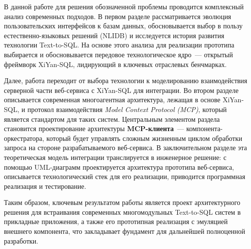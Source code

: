 В данной работе для решения обозначенной проблемы проводится комплексный анализ
современных подходов. В первом разделе рассматривается эволюция пользовательских
интерфейсов к базам данных, обосновывается выбор в пользу естественно-языковых
решений (NLIDB) и исследуется история развития технологии Text-to-SQL.
На основе этого анализа для реализации прототипа выбирается и обосновывается передовое
технологическое ядро~--- открытый фреймворк XiYan-SQL, лидирующий в
ключевых отраслевых бенчмарках.

Далее, работа переходит от выбора технологии к моделированию взаимодействия
серверной части веб-сервиса с XiYan-SQL для интеграции.
Во втором разделе описывается современная многоагентная архитектура, лежащая
в основе XiYan-SQL, и протокол взаимодействия \textit{Model Context Protocol (MCP)},
который является стандартом для таких систем. Центральным элементом раздела
становится проектирование архитектуры \textbf{MCP-клиента}~--- компонента-оркестратора,
который будет управлять сложным жизненным циклом обработки запроса на стороне
разрабатываемого веб-сервиса. В заключительном разделе эта теоретическая модель интеграции
транслируется в инженерное решение: с помощью UML-диаграмм
проектируется архитектура прототипа веб-сервиса, описывается
технологический стек для его реализации, приводится программная реализация и тестирование.

Таким образом, ключевым результатом работы является проект архитектурного
решения для встраивания современных многомодульных Text-to-SQL систем
в прикладные приложения, а также его прототипная реализация с эмуляцией
внешнего компонента, что закладывает фундамент для дальнейшей
полноценной разработки.